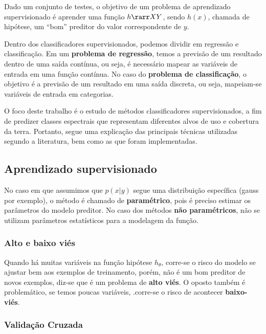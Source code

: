Dado um conjunto de testes, o objetivo de um problema de aprendizado
supervisionado é aprender uma função $h \rarr XY$, sendo $h(x)$, chamada
de hipótese, um ``bom'' preditor do valor correspondente de $y$.

Dentro dos classificadores supervisionados, podemos dividir em
regressão e classificação. Em um \textbf{problema de regressão}, temos a
previsão de um resultado dentro de uma saída contínua, ou seja, é
necessário mapear as variáveis de entrada em uma função contínua. No
caso do \textbf{problema de classificação}, o objetivo é a previsão de
um resultado em uma saída discreta, ou seja, mapeiam-se variáveis de
entrada em categorias. \cite{coursera}

O foco deste trabalho é o estudo de métodos classificadores
supervisionados, a fim de predizer classes espectrais que representam
diferentes alvos de uso e cobertura da terra. Portanto, segue uma
explicação das principais técnicas utilizadas segundo a literatura, bem
como as que foram implementadas.

\subsection{Aprendizado
supervisionado}\label{aprendizado-supervisionado}

No caso em que assumimos que $p(x|y)$ segue uma distribuição
específica (gauss por exemplo), o método é chamado de
\textbf{paramétrico}, pois é preciso estimar os parâmetros do modelo
preditor. No caso dos métodos \textbf{não paramétricos}, não se utilizam
parâmetros estatísticos para a modelagem da função. \cite{waske2009machine}

\subsubsection{Alto e baixo viés}\label{alto-e-baixo-viuxe9s}

Quando há muitas variáveis na função hipótese $h_\theta$, corre-se o
risco do modelo se ajustar bem aos exemplos de treinamento, porém, não é
um bom preditor de novos exemplos, diz-se que é um problema de
\textbf{alto viés}. O oposto também é problemático, se temos poucas
variáveis, .corre-se o risco de acontecer \textbf{baixo-viés}. \cite{coursera}

\subsubsection{Validação Cruzada}\label{validauxe7uxe3o-cruzada}

